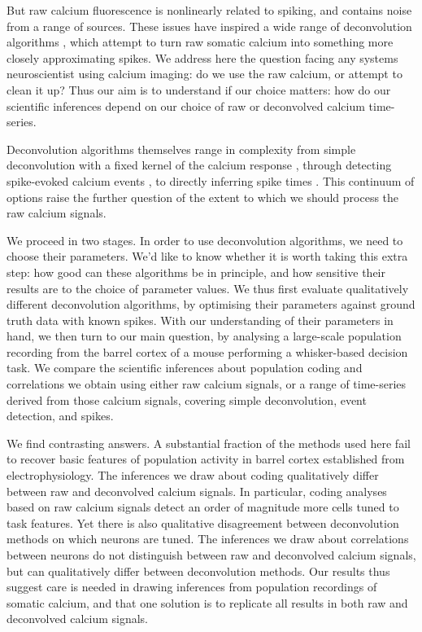 \documentclass[a4paper,11pt]{article}
\begin{document}
But raw calcium fluorescence is nonlinearly related to spiking, and contains noise from a range of sources. These issues have inspired a wide range of deconvolution algorithms \citep{Theis2016-ee, Berens2018-su, Stringer2018-st}, which attempt to turn raw somatic calcium into something more closely approximating spikes. We address here the question facing any systems neuroscientist using calcium imaging: do we use the raw calcium, or attempt to clean it up? Thus our aim is to understand if our choice matters: how do our scientific inferences depend on our choice of raw or deconvolved calcium time-series.

Deconvolution algorithms themselves range in complexity from simple deconvolution with a fixed kernel of the calcium response \citep{Yaksi2006-ic}, through detecting spike-evoked calcium events \citep{Jewell2018-cx, Pachitariu2016-ui}, to directly inferring spike times \citep{Vogelstein2010-uc, Lutcke2013-wu, Deneux2016-gu}. This continuum of options raise the further question of the extent to which we should process the raw calcium signals. 

We proceed in two stages. In order to use deconvolution algorithms, we need to choose their parameters. We’d like to know whether it is worth taking this extra step: how good can these algorithms be in principle, and how sensitive their results are to the choice of parameter values. We thus first evaluate qualitatively different deconvolution algorithms, by optimising their parameters against ground truth data with known spikes. With our understanding of their parameters in hand, we then turn to our main question, by analysing a large-scale population recording from the barrel cortex of a mouse performing a whisker-based decision task. We compare the scientific inferences about population coding and correlations we obtain using either raw calcium signals, or a range of time-series derived from those calcium signals, covering simple deconvolution, event detection, and spikes. 

We find contrasting answers. A substantial fraction of the methods used here fail to recover basic features of population activity in barrel cortex established from electrophysiology. The inferences we draw about coding qualitatively differ between raw and deconvolved calcium signals. In particular, coding analyses based on raw calcium signals detect an order of magnitude more cells tuned to task features. Yet there is also qualitative disagreement between deconvolution methods on which neurons are tuned. The inferences we draw about correlations between neurons do not distinguish between raw and deconvolved calcium signals, but can qualitatively differ between deconvolution methods. Our results thus suggest care is needed in drawing inferences from population recordings of somatic calcium, and that one solution is to replicate all results in both raw and deconvolved calcium signals.
\end{document}
